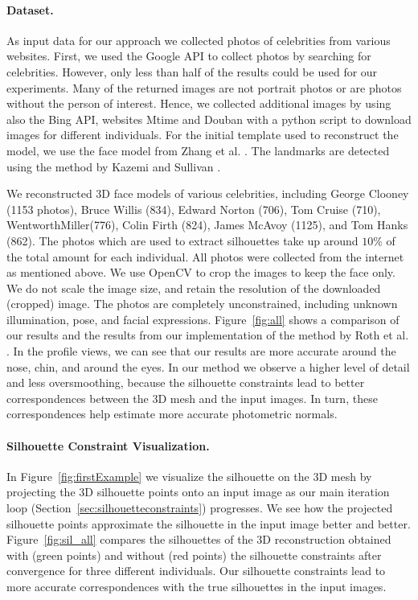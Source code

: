 \paragraph*{Dataset.} As input data for our approach we collected photos of celebrities from various websites. First, we used the Google API to collect photos by searching for celebrities. However, only less than half of the results could be used for our experiments. Many of the returned images are not portrait photos or are photos without the person of interest. Hence, we collected additional images by using also the Bing API, websites Mtime and Douban with a python script to download images for different individuals. For the initial template used to reconstruct the model, we use the face model from Zhang et al. \cite{Zhang04}. The landmarks are detected using the method by Kazemi and Sullivan \cite{kazemi2014one}.

We reconstructed 3D face models of various celebrities, including George Clooney (1153 photos),  Bruce Willis (834), Edward Norton (706), Tom Cruise (710), WentworthMiller(776), Colin Firth (824), James McAvoy (1125), and Tom Hanks (862). The photos which are used to extract silhouettes take up around $10\%$ of the total amount for each individual. All photos were collected from the internet as mentioned above. We use OpenCV to crop the images to keep the face only. We do not scale the image size, and retain the resolution of the downloaded (cropped) image. The photos are completely unconstrained, including unknown illumination, pose, and facial expressions. Figure~\ref{fig:all} shows a comparison of our results and the results from our implementation of the method by Roth et al. \cite{Roth:2015:UFR}. In the profile views, we can see that our results are more accurate around the nose, chin, and around the eyes. In our method we observe a higher level of detail and less oversmoothing, because the silhouette constraints lead to better correspondences between the 3D mesh and the input images. In turn, these correspondences help estimate more accurate photometric normals.

\paragraph*{Silhouette Constraint Visualization.} In Figure~\ref{fig:firstExample} we visualize the silhouette on the 3D mesh by projecting the 3D silhouette points onto an input image as our main iteration loop (Section~\ref{sec:silhouetteconstraints}) progresses. We see how the projected silhouette points approximate the silhouette in the input image better and better. Figure~\ref{fig:sil_all} compares the silhouettes of the 3D reconstruction obtained with (green points) and without (red points) the silhouette constraints after convergence for three different individuals. Our silhouette constraints lead to more accurate correspondences with the true silhouettes in the input images. 


